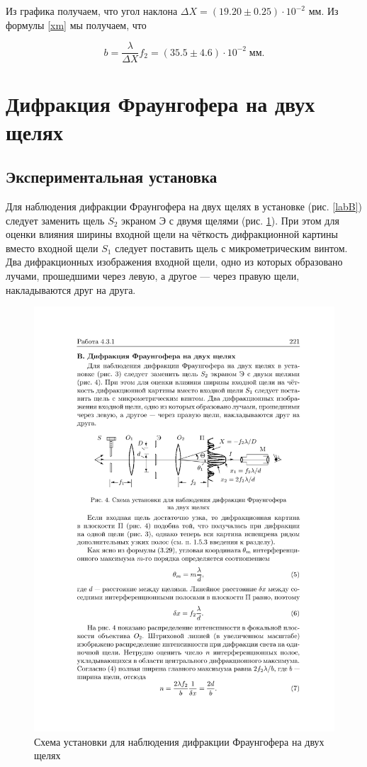 \documentclass[a4paper,12pt]{article} %
\begin{document}
Из графика получаем, что угол наклона $ \Delta X = (19.20 \pm 0.25) \cdot 10^{-2}  $ мм. Из формулы \eqref{xm} мы получаем, что 

\begin{equation}\label{qqq}
b =  \dfrac{\lambda}{\Delta X} f_2 =  (35.5 \pm 4.6) \cdot 10^{-2} \; \text{мм}. 
\end{equation}


\section{Дифракция Фраунгофера на двух щелях}

\subsection{Экспериментальная установка}

Для наблюдения дифракции Фраунгофера на двух щелях в установке (рис. \ref{labB}) следует заменить щель $ S_2 $ экраном Э с двумя щелями
(рис. \ref{labC}). При этом для оценки влияния ширины входной щели на чёткость дифракционной картины вместо входной щели $ S_1 $ следует поставить щель с микрометрическим винтом. Два дифракционных изображения входной щели, одно из которых образовано лучами, прошедшими через левую, а другое --- через правую щели, накладываются друг на друга.

\begin{figure}[h!]
	\centering
	\includegraphics[width=0.8\linewidth]{c.pdf}
	\caption{Схема установки для наблюдения дифракции Фраунгофера на двух щелях}
	\label{labC}
\end{figure}
\end{document}
